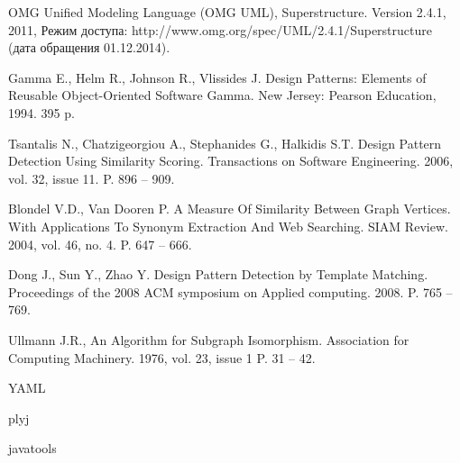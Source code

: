 \begin{thebibliography}{1}

\begin{flushleft}
OMG Unified Modeling Language (OMG UML), Superstructure. Version 2.4.1, 2011, Режим доступа: http://www.omg.org/spec/UML/2.4.1/Superstructure (дата обращения 01.12.2014).
\end{flushleft}

\begin{flushleft}
Gamma E., Helm R., Johnson R., Vlissides J. Design Patterns: Elements of Reusable Object-Oriented Software Gamma. New Jersey: Pearson Education, 1994. 395 p.
\end{flushleft}

\begin{flushleft}
Tsantalis N., Chatzigeorgiou A., Stephanides G., Halkidis S.T. Design Pattern Detection Using Similarity Scoring. Transactions on Software Engineering. 2006, vol. 32, issue 11. P. 896 – 909.
\end{flushleft}

\begin{flushleft}
Blondel V.D., Van Dooren P. A Measure Of Similarity Between Graph Vertices. With Applications To Synonym Extraction And Web Searching. SIAM Review. 2004, vol. 46, no. 4. P. 647 – 666.
\end{flushleft}

\begin{flushleft}
Dong J., Sun Y., Zhao Y. Design Pattern Detection by Template Matching. Proceedings of the 2008 ACM symposium on Applied computing. 2008. P. 765 – 769.
\end{flushleft}

\begin{flushleft}
Ullmann J.R., An Algorithm for Subgraph Isomorphism. Association for Computing Machinery. 1976, vol. 23, issue 1 P. 31 – 42.
\end{flushleft}

\begin{flushleft}
YAML
\end{flushleft}

\begin{flushleft}
plyj
\end{flushleft}

\begin{flushleft}
javatools
\end{flushleft}


\end{thebibliography}
